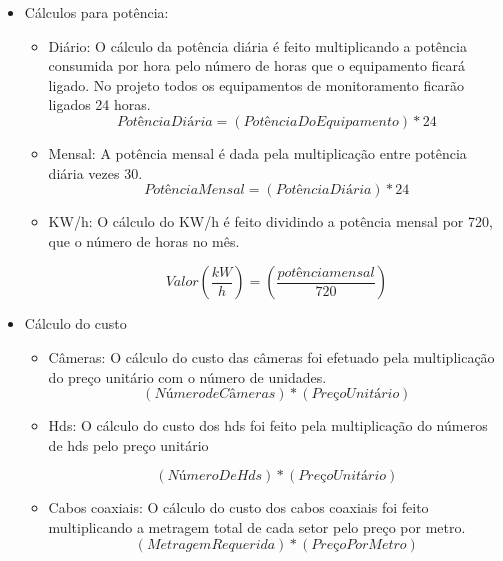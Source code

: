 \begin{itemize}
	\item Cálculos para potência:
	\begin{itemize}
		\item Diário:
		O cálculo da potência diária é feito multiplicando a potência consumida por hora pelo número de horas que o equipamento ficará ligado. No projeto todos os equipamentos de monitoramento ficarão ligados 24 horas.
		\begin{equation}
			Potência Diária = (Potência Do Equipamento) \ast  24
		\end{equation}

		\item Mensal:
		A potência mensal é dada pela multiplicação entre potência diária vezes 30.
		\begin{equation}
			Potência Mensal =  (Potência Diária) \ast  24
		\end{equation}
		
		
		\item KW/h:
		O cálculo do KW/h é feito dividindo a potência mensal por 720, que o número de horas no mês.
		
		\begin{equation}
			Valor(\frac{kW}{h}) = (\frac{potência mensal}{720})
		\end{equation}
			
	\end{itemize}
	
	\item Cálculo do custo
	\begin{itemize}
		\item Câmeras:
   		 O cálculo do custo das câmeras foi efetuado pela multiplicação do preço unitário com o número de unidades.
		\begin{equation}
		(Número de Câmeras) \ast  (Preço Unitário)
		\end{equation}
		
		\item Hds:
  		O cálculo do custo dos hds foi feito pela multiplicação do números de  hds pelo preço unitário

		\begin{equation}
		(Número De Hds) \ast  (Preço Unitário)
		\end{equation}		 

		\item Cabos coaxiais:
		O cálculo do custo dos cabos coaxiais foi feito multiplicando a metragem total de cada setor pelo preço por metro.
		\begin{equation}
		(Metragem Requerida) \ast (Preço Por Metro)	
		\end{equation}			
	\end{itemize}
\end{itemize}


